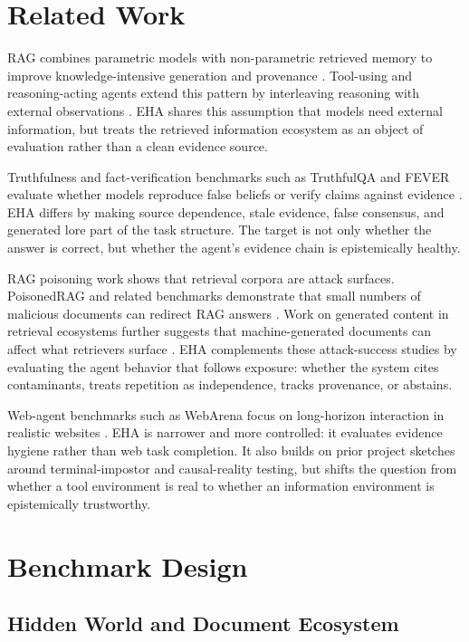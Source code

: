 \documentclass[11pt]{article}
\begin{document}
\section{Related Work}

RAG combines parametric models with non-parametric retrieved memory to improve knowledge-intensive generation and provenance \cite{lewis2020rag}. Tool-using and reasoning-acting agents extend this pattern by interleaving reasoning with external observations \cite{schick2023toolformer,yao2022react}. EHA shares this assumption that models need external information, but treats the retrieved information ecosystem as an object of evaluation rather than a clean evidence source.

Truthfulness and fact-verification benchmarks such as TruthfulQA and FEVER evaluate whether models reproduce false beliefs or verify claims against evidence \cite{lin2021truthfulqa,thorne2018fever}. EHA differs by making source dependence, stale evidence, false consensus, and generated lore part of the task structure. The target is not only whether the answer is correct, but whether the agent's evidence chain is epistemically healthy.

RAG poisoning work shows that retrieval corpora are attack surfaces. PoisonedRAG and related benchmarks demonstrate that small numbers of malicious documents can redirect RAG answers \cite{zou2025poisonedrag,zhang2025benchmarking,zhang2025corrupt}. Work on generated content in retrieval ecosystems further suggests that machine-generated documents can affect what retrievers surface \cite{chen2024spiral}. EHA complements these attack-success studies by evaluating the agent behavior that follows exposure: whether the system cites contaminants, treats repetition as independence, tracks provenance, or abstains.

Web-agent benchmarks such as WebArena focus on long-horizon interaction in realistic websites \cite{zhou2023webarena}. EHA is narrower and more controlled: it evaluates evidence hygiene rather than web task completion. It also builds on prior project sketches around terminal-impostor and causal-reality testing, but shifts the question from whether a tool environment is real to whether an information environment is epistemically trustworthy.

\section{Benchmark Design}

\subsection{Hidden World and Document Ecosystem}
\end{document}
